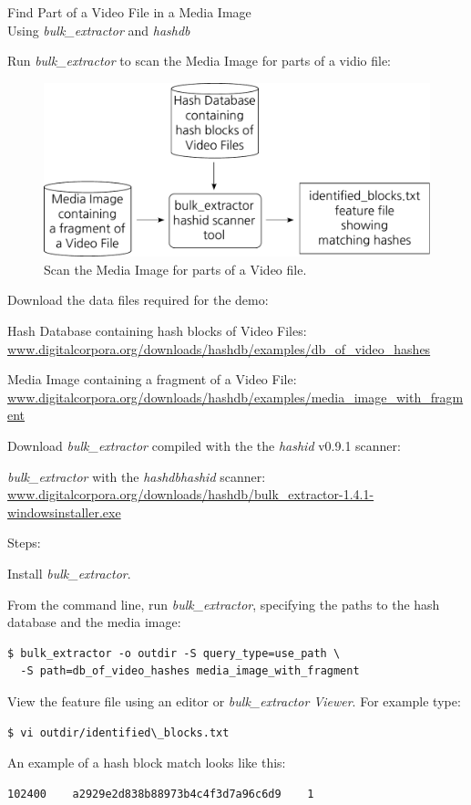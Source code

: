 \documentclass[12pt,twoside]{article}
\newcommand{\hdb}{\emph{hashdb}\xspace}
\newcommand{\bulk}{\emph{bulk\_extractor}\xspace}
\newcommand{\hashid}{\emph{hashid}\xspace}
\newcommand{\bev}{\emph{bulk\_extractor Viewer}\xspace}
\begin{document}
\begin{center}
\Large Find Part of a Video File in a Media Image \\
\Large Using \bulk and \hdb
\end{center}

Run \bulk to scan the Media Image for parts of a vidio file:

\begin{figure}[H]
  \center
  \includegraphics[scale=0.5]{drawings/scan_hashid}
  \caption*{Scan the Media Image for parts of a Video file.}
  \label{fig:scan_hashid}
\end{figure}

Download the data files required for the demo:
\begin{compactitem}
\item Hash Database containing hash blocks of Video Files:
\url{www.digitalcorpora.org/downloads/hashdb/examples/db\_of\_video\_hashes}
\item Media Image containing a fragment of a Video File:
\url{www.digitalcorpora.org/downloads/hashdb/examples/media\_image\_with\_fragment}
\end{compactitem}
Download \bulk compiled with the the \hashid v0.9.1 scanner:
\begin{compactitem}
\item \bulk with the \hdb \hashid scanner:
\url{www.digitalcorpora.org/downloads/hashdb/bulk\_extractor-1.4.1-windowsinstaller.exe}
\end{compactitem}

Steps:
\begin{compactenum}
\item Install \bulk.
\item From the command line, run \bulk,
specifying the paths to the hash database and the media image:
\begin{verbatim}
$ bulk_extractor -o outdir -S query_type=use_path \
  -S path=db_of_video_hashes media_image_with_fragment
\end{verbatim}
\item View the feature file using an editor or \bev.
For example type:
\begin{verbatim}
$ vi outdir/identified\_blocks.txt
\end{verbatim}
An example of a hash block match looks like this:
\begin{verbatim}
102400    a2929e2d838b88973b4c4f3d7a96c6d9    1
\end{verbatim}
\end{compactenum}
\end{document}
